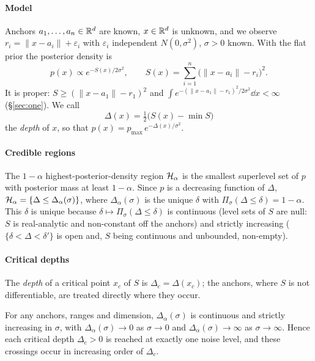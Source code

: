 \paragraph{Model} Anchors $a_1, \dots, a_n \in \mathbb{R}^d$ are known, $x \in \mathbb{R}^d$ is unknown, and we observe
$r_i = \|x - a_i\| + \varepsilon_i$ with $\varepsilon_i$ independent $N(0, \sigma^2)$, $\sigma > 0$ known. With the flat
prior the posterior density is
\[ p(x) \propto e^{-S(x)/2\sigma^2}, \qquad S(x) = \sum_{i=1}^n \bigl(\|x - a_i\| - r_i\bigr)^2 . \]
It is proper: $S \ge (\|x - a_1\| - r_1)^2$ and $\int e^{-(\|x - a_1\| - r_1)^2/2\sigma^2}\dd x < \infty$ (\S\ref{sec:one}).
We call
\[ \Delta(x) = \tfrac12\bigl(S(x) - \min S\bigr) \]
the \emph{depth} of $x$, so that $p(x) = p_{\max}\,e^{-\Delta(x)/\sigma^2}$.

\paragraph{Credible regions} The $1-\alpha$ highest-posterior-density region $\mathcal{H}_\alpha$ is the smallest superlevel set
of $p$ with posterior mass at least $1-\alpha$. Since $p$ is a decreasing function of $\Delta$,
$\mathcal{H}_\alpha = \{\Delta \le \Delta_\alpha(\sigma)\}$, where $\Delta_\alpha(\sigma)$ is the unique $\delta$ with
$\Pi_\sigma(\Delta \le \delta) = 1-\alpha$. This $\delta$ is unique because $\delta \mapsto \Pi_\sigma(\Delta \le \delta)$ is
continuous (level sets of $S$ are null: $S$ is real-analytic and non-constant off the anchors) and strictly increasing
($\{\delta < \Delta < \delta'\}$ is open and, $S$ being continuous and unbounded, non-empty).

\paragraph{Critical depths} The \emph{depth} of a critical point $x_c$ of $S$ is $\Delta_c = \Delta(x_c)$; the anchors,
where $S$ is not differentiable, are treated directly where they occur.

\begin{theorem}\label{thm:depth}
For any anchors, ranges and dimension, $\Delta_\alpha(\sigma)$ is continuous and strictly increasing in $\sigma$, with
$\Delta_\alpha(\sigma) \to 0$ as $\sigma \to 0$ and $\Delta_\alpha(\sigma) \to \infty$ as $\sigma \to \infty$. Hence each
critical depth $\Delta_c > 0$ is reached at exactly one noise level, and these crossings occur in increasing order of
$\Delta_c$.
\end{theorem}

